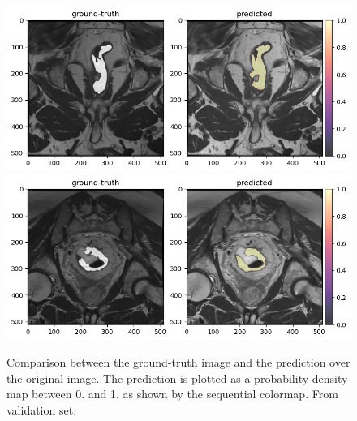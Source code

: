 \documentclass{standalone}
\begin{document}
\begin{figure}[htp]

    \centering
    \includegraphics[width=\textwidth]{../images/predoutputoverlapvalidation.png}
    \includegraphics[width=\textwidth]{../images/predoutputoverlapvalidation1.png}
    
    
    \caption{Comparison between the ground-truth image and the prediction over the original image.
    The prediction is plotted as a probability density map between 0. and 1. as shown by the sequential colormap.
    From validation set.}\label{predoverlapvalidation}

\end{figure}
\end{document}
